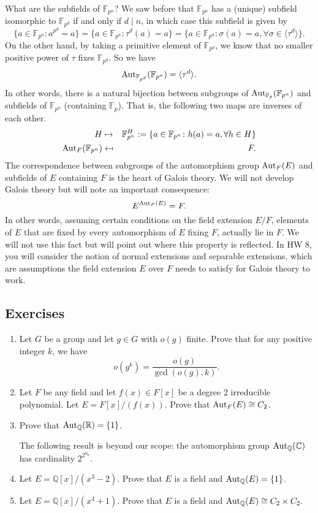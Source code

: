 \documentclass{article}
\def\Aut{{\rm Aut}}
\def\R{{\mathbb R}}
\def\F{{\mathbb F}}
\def\Q{{\mathbb Q}}
\def\F{{\mathbb F}}
\def\Q{{\mathbb Q}}
\def\C{{\mathbb C}}
\begin{document}
What are the subfields of $\F_{p^n}$? We saw before that $\F_{p^n}$ has a (unique) subfield isomorphic to $\F_{p^d}$ if and only if $d\mid n$, in which case this subfield is given by $$\{a\in\F_{p^n}\colon a^{p^d} = a\} = \{a\in\F_{p^n}\colon \tau^d(a) = a\} = \{a\in\F_{p^n}\colon \sigma(a) = a,\forall \sigma\in\langle\tau^d\rangle\}.$$
On the other hand, by taking a primitive element of $\F_{p^d}$, we know that no smaller positive power of $\tau$ fixes $\F_{p^d}$. So we have $$\Aut_{\F_{p^d}}(\F_{p^n}) = \langle \tau^d\rangle.$$
In other words, there is a natural bijection between subgroups of $\Aut_{\F_p}(\F_{p^n})$ and subfields of $\F_{p^n}$ (containing $\F_p$). That is, the following two maps are inverses of each other.
\begin{eqnarray*}
    H&\mapsto& \F_{p^n}^H := \{a\in\F_{p^n}\colon h(a) = a,\forall h\in H\}\\
    \Aut_F(\F_{p^n})&\mapsfrom& F.
\end{eqnarray*}
The correspondence between subgroups of the automorphism group $\Aut_F(E)$ and subfields of $E$ containing $F$ is the heart of Galois theory. We will not develop Galois theory but will note an important consequence:
$$E^{\Aut_F(E)} = F.$$
In other words, assuming certain conditions on the field extension $E/F$, elements of $E$ that are fixed by every automorphism of $E$ fixing $F$, actually lie in $F$. We will not use this fact but will point out where this property is reflected. In HW 8, you will consider the notion of normal extensions and separable extensions, which are assumptions the field extension $E$ over $F$ needs to satisfy for Galois theory to work.

\subsection*{Exercises}
\begin{enumerate}[\thesection .1]
    \item Let $G$ be a group and let $g\in G$ with $o(g)$ finite. Prove that for any positive integer $k$, we have $$o(g^k) = \frac{o(g)}{\gcd(o(g),k)}.$$
    \item Let $F$ be any field and let $f(x)\in F[x]$ be a degree 2 irreducible polynomial. Let $E = F[x]/(f(x))$. Prove that $\Aut_F(E)\cong C_2$.
    \item Prove that $\Aut_\Q(\R) = \{1\}$.

    The following result is beyond our scope: the automorphism group $\Aut_\Q(\C)$ has cardinality $2^{2^{\aleph_0}}.$
    \item Let $E = \Q[x]/(x^3 - 2)$. Prove that $E$ is a field and $\Aut_\Q(E) = \{1\}$.
    \item Let $E = \Q[x]/(x^4 + 1)$. Prove that $E$ is a field and $\Aut_\Q(E) \cong C_2\times C_2.$
\end{enumerate}
\end{document}
